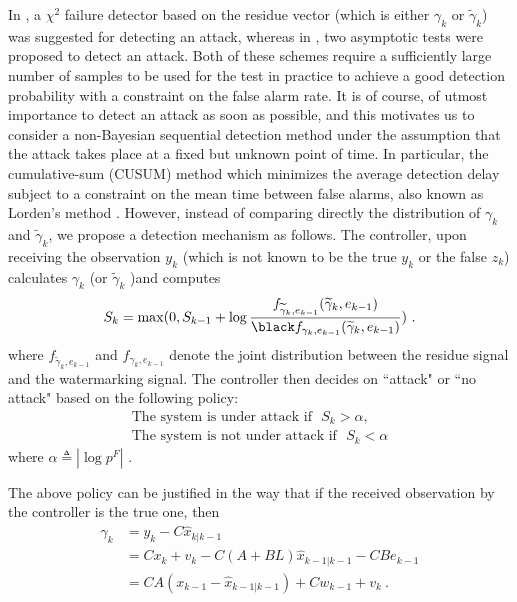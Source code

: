 \documentclass[journal,10pt]{IEEEtran}
\def\no{\nonumber}
\begin{document}
In \cite{mo_sinopoli_15}, a $\chi^2$ failure detector based on the residue vector (which is either $\gamma_k$ or 
${\widetilde{\gamma}_k}$) was suggested for detecting an attack, whereas in \cite{kumar}, two asymptotic tests were proposed to detect an attack. Both of these schemes require a sufficiently large number of samples to be used for the test in practice to achieve a good detection probability with a constraint on the false alarm rate. It is of course, of utmost importance to detect an attack as soon as possible, and this motivates us to consider a non-Bayesian sequential detection method under the assumption that the attack takes place at a fixed but unknown point of time. In particular, the cumulative-sum (CUSUM) method which minimizes the average detection delay subject to a constraint 
on the mean time between false alarms, also known as Lorden's method \cite{quickest_detection_book}. However, instead of comparing directly the distribution of $\gamma_k$ and
${\widetilde{\gamma}_k}$, we propose a  detection mechanism as follows.
The controller, upon receiving the observation $y_{k}$ (which is not known to be the true $y_{k}$ or the false $z_{k}$)
calculates $\gamma_{k}$ (or $\widetilde{\gamma}_k$ )and
computes
\begin{equation}
S_{k}=\max(0,
S_{k-1}+\log\frac{f_{\widetilde{\gamma}_{k}, e_{k-1}}(\widetilde{\gamma}_{k}, e_{k-1})}{\black f_{\gamma_{k}, e_{k-1}}(\widetilde{\gamma}_{k}, e_{k-1})})\ .\label{seqtest}
\end{equation}
where $f_{\widetilde{\gamma}_{k}, e_{k-1}}$ and $f_{\gamma_{k}, e_{k-1}}$ denote the joint distribution between the 
residue signal and the watermarking signal. 
The controller then decides on ``attack" or ``no attack" based on
the following policy:
\begin{eqnarray}
\text{The system is under attack if} \ \ \ S_{k}>\alpha,\no\\
\text{The system is not under attack if} \ \ \ S_{k}<\alpha\label{detect1}
\end{eqnarray}
where $\alpha\triangleq |\log p^{F}|$ .



The above policy can be justified in the way that if the received
observation by the controller is the true one, then
\begin{align}
\gamma_{k} & =y_{k}-C\hat{x}_{k|k-1}\nonumber \\
&=Cx_{k}+v_{k}-C(A+BL)\hat{x}_{k-1|k-1}-CBe_{k-1}\no\\
&=CA(x_{k-1}-\hat{x}_{k-1|k-1})+Cw_{k-1}+v_{k}\ .\label{eq1}
\end{align}
\end{document}
